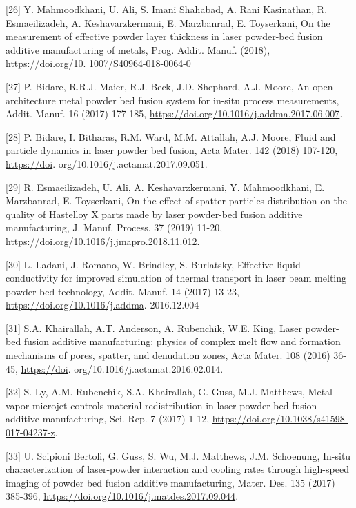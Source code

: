 \documentclass[10pt]{article}
\begin{document}
[26] Y. Mahmoodkhani, U. Ali, S. Imani Shahabad, A. Rani Kasinathan, R. Esmaeilizadeh, A. Keshavarzkermani, E. Marzbanrad, E. Toyserkani, On the measurement of effective powder layer thickness in laser powder-bed fusion additive manufacturing of metals, Prog. Addit. Manuf. (2018), \href{https://doi.org/10}{https://doi.org/10}. 1007/S40964-018-0064-0

[27] P. Bidare, R.R.J. Maier, R.J. Beck, J.D. Shephard, A.J. Moore, An open-architecture metal powder bed fusion system for in-situ process measurements, Addit. Manuf. 16 (2017) 177-185, \href{https://doi.org/10.1016/j.addma.2017.06.007}{https://doi.org/10.1016/j.addma.2017.06.007}.

[28] P. Bidare, I. Bitharas, R.M. Ward, M.M. Attallah, A.J. Moore, Fluid and particle dynamics in laser powder bed fusion, Acta Mater. 142 (2018) 107-120, \href{https://doi}{https://doi}. org/10.1016/j.actamat.2017.09.051.

[29] R. Esmaeilizadeh, U. Ali, A. Keshavarzkermani, Y. Mahmoodkhani, E. Marzbanrad, E. Toyserkani, On the effect of spatter particles distribution on the quality of Hastelloy $\mathrm{X}$ parts made by laser powder-bed fusion additive manufacturing, $\mathrm{J}$. Manuf. Process. 37 (2019) 11-20, \href{https://doi.org/10.1016/j.jmapro.2018.11.012}{https://doi.org/10.1016/j.jmapro.2018.11.012}.

[30] L. Ladani, J. Romano, W. Brindley, S. Burlatsky, Effective liquid conductivity for improved simulation of thermal transport in laser beam melting powder bed technology, Addit. Manuf. 14 (2017) 13-23, \href{https://doi.org/10.1016/j.addma}{https://doi.org/10.1016/j.addma}. 2016.12.004

[31] S.A. Khairallah, A.T. Anderson, A. Rubenchik, W.E. King, Laser powder-bed fusion additive manufacturing: physics of complex melt flow and formation mechanisms of pores, spatter, and denudation zones, Acta Mater. 108 (2016) 36-45, \href{https://doi}{https://doi}. org/10.1016/j.actamat.2016.02.014.

[32] S. Ly, A.M. Rubenchik, S.A. Khairallah, G. Guss, M.J. Matthews, Metal vapor microjet controls material redistribution in laser powder bed fusion additive manufacturing, Sci. Rep. 7 (2017) 1-12, \href{https://doi.org/10.1038/s41598-017-04237-z}{https://doi.org/10.1038/s41598-017-04237-z}.

[33] U. Scipioni Bertoli, G. Guss, S. Wu, M.J. Matthews, J.M. Schoenung, In-situ characterization of laser-powder interaction and cooling rates through high-speed imaging of powder bed fusion additive manufacturing, Mater. Des. 135 (2017) 385-396, \href{https://doi.org/10.1016/j.matdes.2017.09.044}{https://doi.org/10.1016/j.matdes.2017.09.044}.
\end{document}
